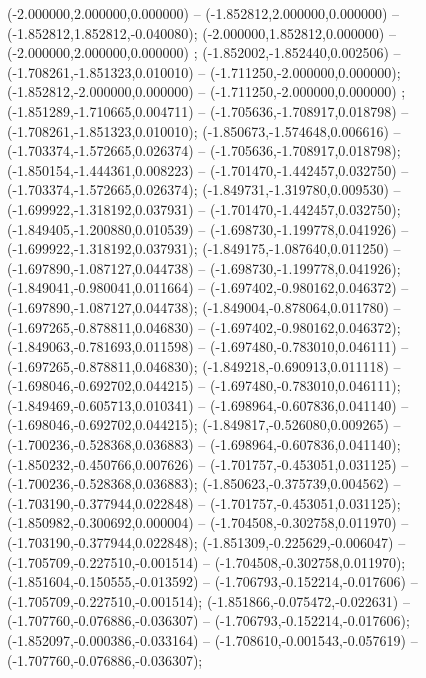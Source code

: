  (-2.000000,2.000000,0.000000) -- (-1.852812,2.000000,0.000000) -- (-1.852812,1.852812,-0.040080);
 (-2.000000,1.852812,0.000000) -- (-2.000000,2.000000,0.000000) ;
 (-1.852002,-1.852440,0.002506) -- (-1.708261,-1.851323,0.010010) -- (-1.711250,-2.000000,0.000000);
 (-1.852812,-2.000000,0.000000) -- (-1.711250,-2.000000,0.000000) ;
 (-1.851289,-1.710665,0.004711) -- (-1.705636,-1.708917,0.018798) -- (-1.708261,-1.851323,0.010010);
 (-1.850673,-1.574648,0.006616) -- (-1.703374,-1.572665,0.026374) -- (-1.705636,-1.708917,0.018798);
 (-1.850154,-1.444361,0.008223) -- (-1.701470,-1.442457,0.032750) -- (-1.703374,-1.572665,0.026374);
 (-1.849731,-1.319780,0.009530) -- (-1.699922,-1.318192,0.037931) -- (-1.701470,-1.442457,0.032750);
 (-1.849405,-1.200880,0.010539) -- (-1.698730,-1.199778,0.041926) -- (-1.699922,-1.318192,0.037931);
 (-1.849175,-1.087640,0.011250) -- (-1.697890,-1.087127,0.044738) -- (-1.698730,-1.199778,0.041926);
 (-1.849041,-0.980041,0.011664) -- (-1.697402,-0.980162,0.046372) -- (-1.697890,-1.087127,0.044738);
 (-1.849004,-0.878064,0.011780) -- (-1.697265,-0.878811,0.046830) -- (-1.697402,-0.980162,0.046372);
 (-1.849063,-0.781693,0.011598) -- (-1.697480,-0.783010,0.046111) -- (-1.697265,-0.878811,0.046830);
 (-1.849218,-0.690913,0.011118) -- (-1.698046,-0.692702,0.044215) -- (-1.697480,-0.783010,0.046111);
 (-1.849469,-0.605713,0.010341) -- (-1.698964,-0.607836,0.041140) -- (-1.698046,-0.692702,0.044215);
 (-1.849817,-0.526080,0.009265) -- (-1.700236,-0.528368,0.036883) -- (-1.698964,-0.607836,0.041140);
 (-1.850232,-0.450766,0.007626) -- (-1.701757,-0.453051,0.031125) -- (-1.700236,-0.528368,0.036883);
 (-1.850623,-0.375739,0.004562) -- (-1.703190,-0.377944,0.022848) -- (-1.701757,-0.453051,0.031125);
 (-1.850982,-0.300692,0.000004) -- (-1.704508,-0.302758,0.011970) -- (-1.703190,-0.377944,0.022848);
 (-1.851309,-0.225629,-0.006047) -- (-1.705709,-0.227510,-0.001514) -- (-1.704508,-0.302758,0.011970);
 (-1.851604,-0.150555,-0.013592) -- (-1.706793,-0.152214,-0.017606) -- (-1.705709,-0.227510,-0.001514);
 (-1.851866,-0.075472,-0.022631) -- (-1.707760,-0.076886,-0.036307) -- (-1.706793,-0.152214,-0.017606);
 (-1.852097,-0.000386,-0.033164) -- (-1.708610,-0.001543,-0.057619) -- (-1.707760,-0.076886,-0.036307);
